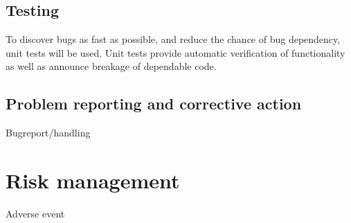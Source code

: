 \documentclass{article}
\begin{document}
\subsection{Testing}

To discover bugs as fast as possible, and reduce the chance of bug dependency, unit tests will be used.
Unit tests provide automatic verification of functionality as well as announce breakage of dependable code.

\subsection{Problem reporting and corrective action}
Bugreport/handling


\section{Risk management}
Adverse event
\section{}
\end{document}

